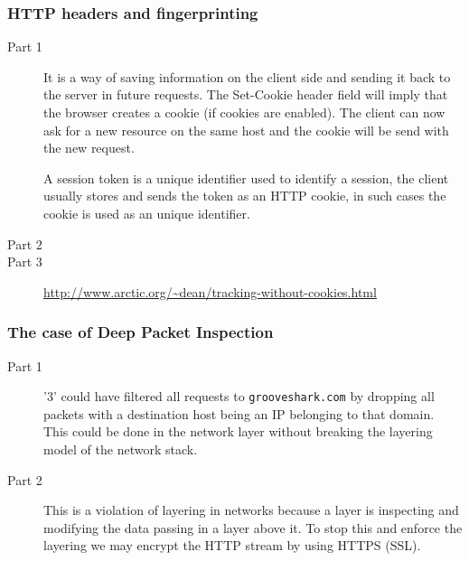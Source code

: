 \documentclass[a4paper]{article}
\begin{document}
\subsubsection{HTTP headers and fingerprinting}
\begin{description}
\item[Part 1] It is a way of saving information on the client side and sending
    it back to the server in future requests. The Set-Cookie header field will
    imply that the browser creates a cookie (if cookies are enabled). The
    client can now ask for a new resource on the same host and the cookie will
    be send with the new request.
    
    A session token is a unique identifier used to identify a session, the
    client usually stores and sends the token as an HTTP cookie, in such cases
    the cookie is used as an unique identifier.

\item[Part 2] 
\item[Part 3] \url{http://www.arctic.org/~dean/tracking-without-cookies.html}
\end{description}

\subsubsection{The case of Deep Packet Inspection}

\begin{description}
    \item[Part 1] '3' could have filtered all requests to
        \texttt{grooveshark.com} by dropping all packets with a destination
        host being an IP belonging to that domain. This could be done in the
        network layer without breaking the layering model of the network stack.
    \item[Part 2] This is a violation of layering in networks because a layer
        is inspecting and modifying the data passing in a layer above it. To
        stop this and enforce the layering we may encrypt the HTTP stream by
        using HTTPS (SSL).
\end{description}


\end{document}
